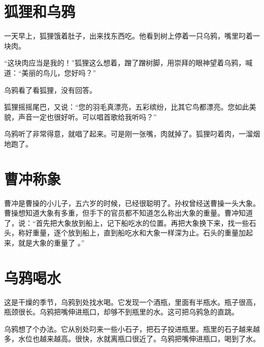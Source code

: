 \documentclass[12pt,UTF-8,openany]{ctexbook}
\begin{document}
\chapter{狐狸和乌鸦}

\begin{Large}
    
    一天早上，狐狸饿着肚子，出来找东西吃。他看到树上停着一只乌鸦，嘴里叼着一块肉。
    
    “这块肉应当是我的！”狐狸这么想着，蹭了蹭树脚，用崇拜的眼神望着乌鸦，喊道：“美丽的鸟儿，您好吗？”
    
    乌鸦看了看狐狸，没有回答。
    
    狐狸摇摇尾巴，又说：“您的羽毛真漂亮，五彩缤纷，比其它鸟都漂亮。您如此美貌，声音一定也很好听。可以唱首歌给我听吗？”
    
    乌鸦听了非常得意，就唱了起来。可是刚一张嘴，肉就掉了。狐狸叼着肉，一溜烟地跑了。
    
\end{Large}

\chapter{曹冲称象}

\begin{Large}
    
    曹冲是曹操的小儿子，五六岁的时候，已经很聪明了。孙权曾经送曹操一头大象。曹操想知道大象有多重，但手下的官员都不知道怎么称出大象的重量。曹冲知道了，说：“首先把大象放到船上，记下船吃水的位置。再把大象换下来，找一些石头，称好重量，逐个放到船上，直到船吃水和大象一样深为止。石头的重量加起来，就是大象的重量了  。”
    
\end{Large}

\chapter{乌鸦喝水}

\begin{Large}
    
    这是干燥的季节，乌鸦到处找水喝。它发现一个酒瓶，里面有半瓶水。瓶子很高，瓶颈很长。乌鸦把嘴伸进瓶口，却够不到瓶里的水。这可把乌鸦急的直跳。
    
    乌鸦想了个办法。它从别处叼来一些小石子，把石子投进瓶里。瓶里的石子越来越多，水位也越来越高。很快，水就离瓶口很近了。乌鸦把嘴伸进瓶口，喝到了水。
    
\end{Large}
\end{document}
